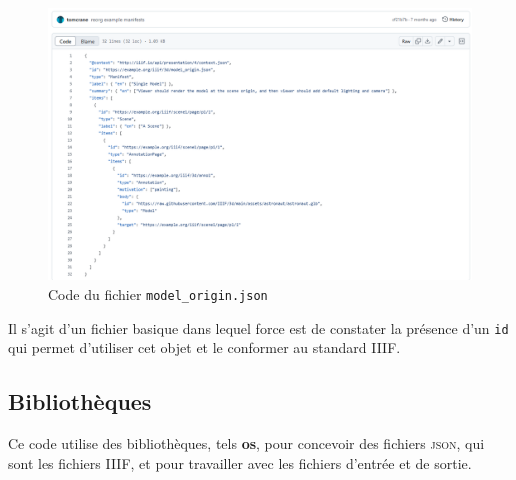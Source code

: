         \begin{figure}[h!]
            \centering
            \includegraphics[width=12cm]{02_images/part_02/06_model.png}
            \caption{Code du fichier \texttt{model\_origin.json}}
        \end{figure}

        Il s'agit d'un fichier basique dans lequel force est de constater la présence d'un \texttt{id} qui permet d'utiliser cet objet et le conformer au standard IIIF.
        
        \subsection{Bibliothèques}
        Ce code \py utilise des bibliothèques, tels \textbf{os}, pour concevoir des fichiers \textsc{json}, qui sont les fichiers  IIIF, et pour travailler avec les fichiers d'entrée et de sortie.